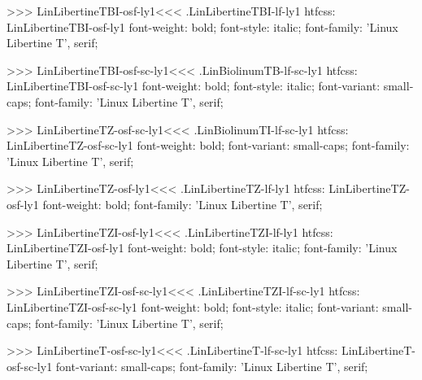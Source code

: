 {{{>>>
\<LinLibertineTBI-osf-ly1\><<<
.LinLibertineTBI-lf-ly1
htfcss:  LinLibertineTBI-osf-ly1  font-weight: bold; font-style: italic; font-family: 'Linux Libertine T', serif;

>>>
\<LinLibertineTBI-osf-sc-ly1\><<<
.LinBiolinumTB-lf-sc-ly1
htfcss:  LinLibertineTBI-osf-sc-ly1  font-weight: bold; font-style: italic; font-variant: small-caps; font-family: 'Linux Libertine T', serif;

>>>
\<LinLibertineTZ-osf-sc-ly1\><<<
.LinBiolinumTI-lf-sc-ly1
htfcss:  LinLibertineTZ-osf-sc-ly1  font-weight: bold; font-variant: small-caps; font-family: 'Linux Libertine T', serif;

>>>
\<LinLibertineTZ-osf-ly1\><<<
.LinLibertineTZ-lf-ly1
htfcss:  LinLibertineTZ-osf-ly1  font-weight: bold; font-family: 'Linux Libertine T', serif;

>>>
\<LinLibertineTZI-osf-ly1\><<<
.LinLibertineTZI-lf-ly1
htfcss:  LinLibertineTZI-osf-ly1  font-weight: bold; font-style: italic; font-family: 'Linux Libertine T', serif;

>>>
\<LinLibertineTZI-osf-sc-ly1\><<<
.LinLibertineTZI-lf-sc-ly1
htfcss:  LinLibertineTZI-osf-sc-ly1  font-weight: bold; font-style: italic; font-variant: small-caps; font-family: 'Linux Libertine T', serif;

>>>
\<LinLibertineT-osf-sc-ly1\><<<
.LinLibertineT-lf-sc-ly1
htfcss:  LinLibertineT-osf-sc-ly1  font-variant: small-caps; font-family: 'Linux Libertine T', serif;

}}}
